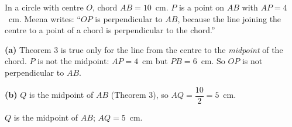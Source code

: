 
\ques In a circle with centre $O$, chord $AB=10$~cm. $P$ is a point on $AB$ with $AP=4$~cm. Meena writes: ``$OP$ is perpendicular to $AB$, because the line joining the centre to a point of a chord is perpendicular to the chord.''
\begin{answerblock}
\begin{minipage}[t]{0.66\linewidth}\vspace{0pt}
\textbf{(a)} Theorem 3 is true only for the line from the centre to the \emph{midpoint} of the chord. $P$ is not the midpoint: $AP=4$~cm but $PB=6$~cm. So $OP$ is not perpendicular to $AB$.

\textbf{(b)} $Q$ is the midpoint of $AB$ (Theorem 3), so $AQ=\dfrac{10}{2}=5$~cm.

\Ans $Q$ is the midpoint of $AB$; $AQ=5$~cm.
\end{minipage}\hfill
\begin{minipage}[t]{0.3\linewidth}\vspace{0pt}
\centering
{}
\end{minipage}
\end{answerblock}

